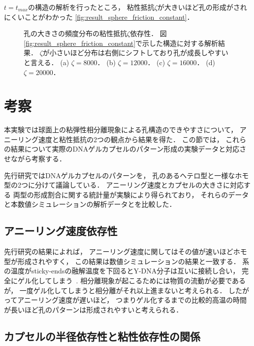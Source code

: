 $t=t_{max}$の構造の解析を行ったところ，
粘性抵抗$\zeta$が大きいほど孔の形成がされにくいことがわかった
\ref{fig:result_sphere_friction_constant}．

\begin{figure}
\centering

\caption{
    孔の大きさの頻度分布の粘性抵抗$\zeta$依存性．
    図\ref{fig:result_sphere_friction_constant}で示した構造に対する解析結果．
    $\zeta$が小さいほど分布は右側にシフトしており孔が成長しやすいと言える．
    (a) $\zeta=8000$．
    (b) $\zeta=12000$．
    (c) $\zeta=16000$．
    (d) $\zeta=20000$．
}
\label{fig:result_sphere_friction_constant_hist}
\end{figure}


\section{考察}

本実験では球面上の粘弾性相分離現象による孔構造のできやすさについて，
アニーリング速度と粘性抵抗の2つの観点から結果を得た．
この節では，
これらの結果について実際のDNAゲルカプセルのパターン形成の実験データと対応させながら考察する．

先行研究ではDNAゲルカプセルのパターンを，
孔のあるヘテロ型と一様なホモ型の2つに分けて議論している．
アニーリング速度とカプセルの大きさに対応する
両型の形成割合に関する統計量が実験により得られており，
それらのデータと本数値シミュレーションの解析データとを比較した．

\subsection{アニーリング速度依存性}

先行研究の結果によれば，
アニーリング速度に関してはその値が速いほどホモ型が形成されやすく，
この結果は数値シミュレーションの結果と一致する．
系の温度がsticky-endsの融解温度を下回るとY-DNA分子は互いに接続し合い，
完全にゲル化してしまう~\cite{sato2019sequence}.
相分離現象が起こるためには物質の流動が必要であるが，
一度ゲル化してしまうと相分離がそれ以上進まないと考えられる．
したがってアニーリング速度が遅いほど，
つまりゲル化するまでの比較的高温の時間が長いほど孔のパターンは形成されやすいと考えられる．

\subsection{カプセルの半径依存性と粘性依存性の関係}

